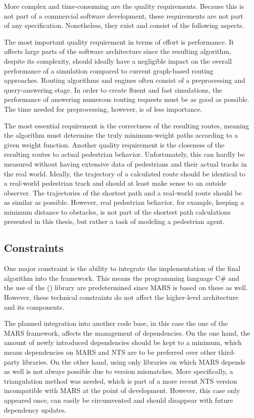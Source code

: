 		More complex and time-consuming are the quality requirements.
		Because this is not part of a commercial software development, these requirements are not part of any specification.
		Nonetheless, they exist and consist of the following aspects.
	
		The most important quality requirement in terms of effort is performance.
		It affects large parts of the software architecture since the resulting algorithm, despite its complexity, should ideally have a negligible impact on the overall performance of a simulation compared to current graph-based routing approaches.
		Routing algorithms and engines often consist of a preprocessing and query-answering stage.
		In order to create fluent and fast simulations, the performance of answering numerous routing requests must be as good as possible.
		The time needed for preprocessing, however, is of less importance.
		
		The most essential requirement is the correctness of the resulting routes, meaning the algorithm must determine the truly minimum-weight paths according to a given weight function.
		Another quality requirement is the closeness of the resulting routes to actual pedestrian behavior.
		Unfortunately, this can hardly be measured without having extensive data of pedestrians and their actual tracks in the real world.
		Ideally, the trajectory of a calculated route should be identical to a real-world pedestrian track and should at least make sense to an outside observer.
		The trajectories of the shortest path and a real-world route should be as similar as possible.
		However, real pedestrian behavior, for example, keeping a minimum distance to obstacles, is not part of the shortest path calculations presented in this thesis, but rather a task of modeling a pedestrian agent.
	
	\subsection{Constraints}
	\label{subsec:constraints}
		
		One major constraint is the ability to integrate the implementation of the final algorithm into the  framework.
		This means the programming language C\# and the use of the  () library are predetermined since MARS is based on these as well.
		However, these technical constraints do not affect the higher-level architecture and its components.
		
		The planned integration into another code base, in this case the one of the MARS framework, affects the management of dependencies.
		On the one hand, the amount of newly introduced dependencies should be kept to a minimum, which means dependencies on MARS and NTS are to be preferred over other third-party libraries.
		On the other hand, using only libraries on which MARS depends as well is not always possible due to version mismatches.
		More specifically, a triangulation method was needed, which is part of a more recent NTS version incompatible with MARS at the point of development.
		However, this case only appeared once, can easily be circumvented and should disappear with future dependency updates.
		
